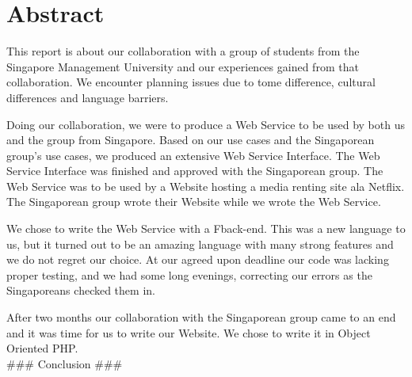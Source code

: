 \section*{Abstract}
This report is about our collaboration with a group of students from the Singapore Management University and our experiences gained from that collaboration. We encounter planning issues due to tome difference, cultural differences and language barriers.

Doing our collaboration, we were to produce a Web Service to be used by both us and the group from Singapore. Based on our use cases and the Singaporean group's use cases, we produced an extensive Web Service Interface. The Web Service Interface was finished and approved with the Singaporean group.
The Web Service was to be used by a Website hosting a media renting site ala Netflix. The Singaporean group wrote their Website while we wrote the Web Service.

We chose to write the Web Service with a F\Sh back-end. This was a new language to us, but it turned out to be an amazing language with many strong features and we do not regret our choice.
At our agreed upon deadline our code was lacking proper testing, and we had some long evenings, correcting our errors as the Singaporeans checked them in.

After two months our collaboration with the Singaporean group came to an end and it was time for us to write our Website. We chose to write it in Object Oriented PHP.
\newline
\\
\#\#\# Conclusion \#\#\# 
\newpage